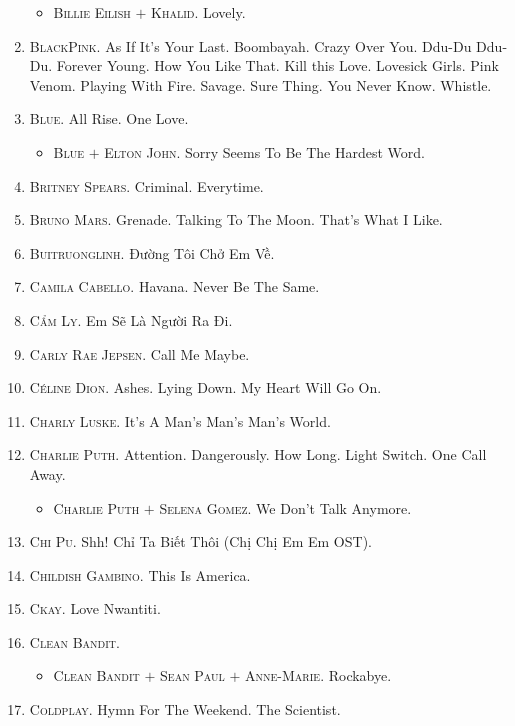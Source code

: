 \documentclass{article}
\begin{document}
\begin{enumerate}
	\begin{itemize}
		\item \textsc{Billie Eilish $+$ Khalid.} Lovely.
	\end{itemize}
	\item \textsc{BlackPink.} As If It's Your Last. Boombayah. Crazy Over You. Ddu-Du Ddu-Du. Forever Young. How You Like That. Kill this Love. Lovesick Girls. Pink Venom. Playing With Fire. Savage. Sure Thing. You Never Know. Whistle.
	\item \textsc{Blue.} All Rise. One Love.
	\begin{itemize}
		\item \textsc{Blue $+$ Elton John.} Sorry Seems To Be The Hardest Word.
	\end{itemize}
	\item \textsc{Britney Spears.} Criminal. Everytime.
	\item \textsc{Bruno Mars.} Grenade. Talking To The Moon. That's What I Like.
	\item \textsc{Buitruonglinh.} Đường Tôi Chở Em Về.
	\item \textsc{Camila Cabello.} Havana. Never Be The Same.
	\item \textsc{Cẩm Ly.} Em Sẽ Là Người Ra Đi.
	\item \textsc{Carly Rae Jepsen.} Call Me Maybe.
	\item \textsc{C\'eline Dion.} Ashes. Lying Down. My Heart Will Go On.
	\item \textsc{Charly Luske.} It's A Man's Man's Man's World.
	\item \textsc{Charlie Puth.} Attention. Dangerously. How Long. Light Switch. One Call Away.
	\begin{itemize}
		\item \textsc{Charlie Puth $+$ Selena Gomez.} We Don't Talk Anymore.
	\end{itemize}
	\item \textsc{Chi Pu.} Shh! Chỉ Ta Biết Thôi (Chị Chị Em Em OST).
	\item \textsc{Childish Gambino.} This Is America.
	\item \textsc{Ckay.} Love Nwantiti.
	\item \textsc{Clean Bandit.}
	\begin{itemize}
		\item \textsc{Clean Bandit $+$ Sean Paul $+$ Anne-Marie.} Rockabye.
	\end{itemize}
	\item \textsc{Coldplay.} Hymn For The Weekend. The Scientist.

\end{enumerate}
\end{document}
